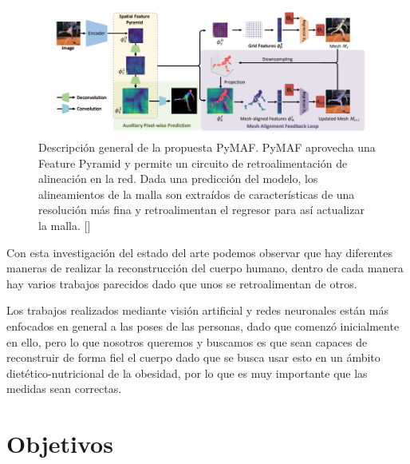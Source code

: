 \begin{figure}[H]
	\centering
	\includegraphics[scale=0.6]{imagenes/estadoarte3.png}
	\caption{ Descripción general de la propuesta PyMAF. PyMAF aprovecha una Feature Pyramid y permite un circuito de retroalimentación de alineación en la red. Dada una predicción del modelo, los alineamientos de la malla son extraídos de características de una resolución más fina y retroalimentan el regresor para así actualizar la malla.  [\cite{pymaf}]   }
	\label{fig:figura4}
\end{figure}



Con esta investigación del estado del arte podemos observar que hay diferentes maneras de realizar la reconstrucción del cuerpo humano, dentro de cada manera hay varios trabajos parecidos dado que unos se retroalimentan de otros. 

Los trabajos realizados mediante visión artificial y redes neuronales están más enfocados en general a las poses de las personas, dado que comenzó inicialmente en ello, pero lo que nosotros queremos y buscamos es que sean capaces de reconstruir de forma fiel el cuerpo dado que se busca usar esto en un ámbito dietético-nutricional de la obesidad, por lo que es muy importante que las medidas sean correctas.





\clearpage




\section{Objetivos}



